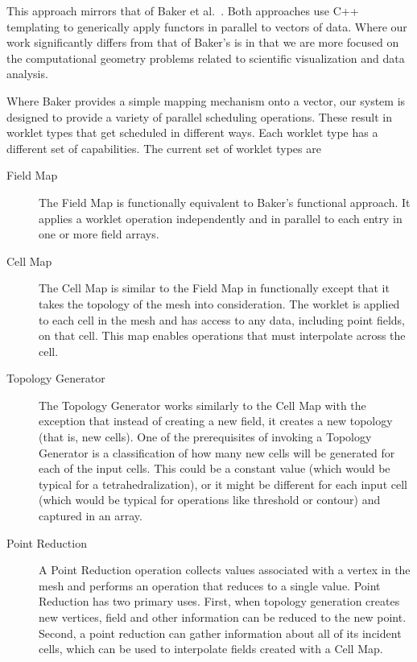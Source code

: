 \documentclass{sig-alternate}
\newcommand*{\scite}[1]{~\cite{#1}}
\newcommand{\etal}{et al.}
\begin{document}
This approach mirrors that of Baker \etal\scite{Baker2010}.  Both
approaches use C++ templating to generically apply functors in parallel to
vectors of data.  Where our work significantly differs from that of Baker's
is in that we are more focused on the computational geometry problems
related to scientific visualization and data analysis.

Where Baker provides a simple mapping mechanism onto a vector, our system
is designed to provide a variety of parallel scheduling operations.  These
result in worklet types that get scheduled in different ways.  Each worklet
type has a different set of capabilities.  The current set of worklet types
are

\begin{description}
\item[Field Map] The Field Map is functionally equivalent to Baker's
  functional approach.  It applies a worklet operation independently and in
  parallel to each entry in one or more field arrays.
\item[Cell Map] The Cell Map is similar to the Field Map in functionally
  except that it takes the topology of the mesh into consideration.  The
  worklet is applied to each cell in the mesh and has access to any data,
  including point fields, on that cell.  This map enables operations that
  must interpolate across the cell.
\item[Topology Generator] The Topology Generator works similarly to the
  Cell Map with the exception that instead of creating a new field, it
  creates a new topology (that is, new cells).  One of the prerequisites of
  invoking a Topology Generator is a classification of how many new cells
  will be generated for each of the input cells.  This could be a constant
  value (which would be typical for a tetrahedralization), or it might be
  different for each input cell (which would be typical for operations like
  threshold or contour) and captured in an array.
\item[Point Reduction] A Point Reduction operation collects values
  associated with a vertex in the mesh and performs an operation that
  reduces to a single value.  Point Reduction has two primary uses.  First,
  when topology generation creates new vertices, field and other
  information can be reduced to the new point.  Second, a point reduction
  can gather information about all of its incident cells, which can be used
  to interpolate fields created with a Cell Map.
\end{description}
\end{document}
